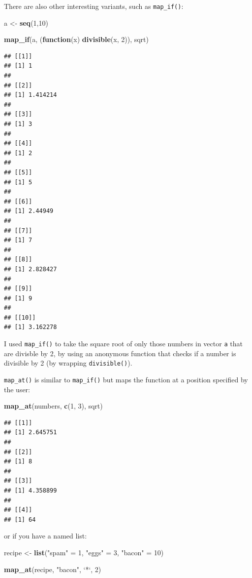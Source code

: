 \documentclass[]{gitbook}
\newenvironment{Shaded}{\begin{snugshade}}{\end{snugshade}}
\newcommand{\ControlFlowTok}[1]{\textcolor[rgb]{0.13,0.29,0.53}{\textbf{#1}}}
\newcommand{\DataTypeTok}[1]{\textcolor[rgb]{0.13,0.29,0.53}{#1}}
\newcommand{\DecValTok}[1]{\textcolor[rgb]{0.00,0.00,0.81}{#1}}
\newcommand{\KeywordTok}[1]{\textcolor[rgb]{0.13,0.29,0.53}{\textbf{#1}}}
\newcommand{\NormalTok}[1]{#1}
\newcommand{\StringTok}[1]{\textcolor[rgb]{0.31,0.60,0.02}{#1}}
\begin{document}
There are also other interesting variants, such as \texttt{map\_if()}:

\begin{Shaded}
\begin{Highlighting}[]
\NormalTok{a <-}\StringTok{ }\KeywordTok{seq}\NormalTok{(}\DecValTok{1}\NormalTok{,}\DecValTok{10}\NormalTok{)}

\KeywordTok{map_if}\NormalTok{(a, (}\ControlFlowTok{function}\NormalTok{(x) }\KeywordTok{divisible}\NormalTok{(x, }\DecValTok{2}\NormalTok{)), sqrt)}
\end{Highlighting}
\end{Shaded}

\begin{verbatim}
## [[1]]
## [1] 1
## 
## [[2]]
## [1] 1.414214
## 
## [[3]]
## [1] 3
## 
## [[4]]
## [1] 2
## 
## [[5]]
## [1] 5
## 
## [[6]]
## [1] 2.44949
## 
## [[7]]
## [1] 7
## 
## [[8]]
## [1] 2.828427
## 
## [[9]]
## [1] 9
## 
## [[10]]
## [1] 3.162278
\end{verbatim}

I used \texttt{map\_if()} to take the square root of only those numbers in vector \texttt{a} that are divisble by 2,
by using an anonymous function that checks if a number is divisible by 2 (by wrapping \texttt{divisible()}).

\texttt{map\_at()} is similar to \texttt{map\_if()} but maps the function at a position specified by the user:

\begin{Shaded}
\begin{Highlighting}[]
\KeywordTok{map_at}\NormalTok{(numbers, }\KeywordTok{c}\NormalTok{(}\DecValTok{1}\NormalTok{, }\DecValTok{3}\NormalTok{), sqrt)}
\end{Highlighting}
\end{Shaded}

\begin{verbatim}
## [[1]]
## [1] 2.645751
## 
## [[2]]
## [1] 8
## 
## [[3]]
## [1] 4.358899
## 
## [[4]]
## [1] 64
\end{verbatim}

or if you have a named list:

\begin{Shaded}
\begin{Highlighting}[]
\NormalTok{recipe <-}\StringTok{ }\KeywordTok{list}\NormalTok{(}\StringTok{"spam"}\NormalTok{ =}\StringTok{ }\DecValTok{1}\NormalTok{, }\StringTok{"eggs"}\NormalTok{ =}\StringTok{ }\DecValTok{3}\NormalTok{, }\StringTok{"bacon"}\NormalTok{ =}\StringTok{ }\DecValTok{10}\NormalTok{)}

\KeywordTok{map_at}\NormalTok{(recipe, }\StringTok{"bacon"}\NormalTok{, }\StringTok{`}\DataTypeTok{*}\StringTok{`}\NormalTok{, }\DecValTok{2}\NormalTok{)}
\end{Highlighting}
\end{Shaded}
\end{document}
